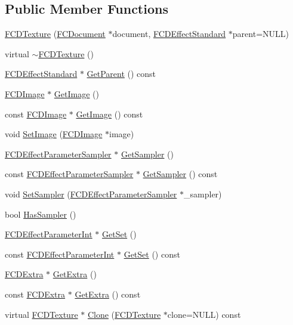\subsection*{Public Member Functions}
\begin{DoxyCompactItemize}
\item 
\hyperlink{classFCDTexture_a9e67960ce2912e1e9622240b658de5ce}{FCDTexture} (\hyperlink{classFCDocument}{FCDocument} $\ast$document, \hyperlink{classFCDEffectStandard}{FCDEffectStandard} $\ast$parent=NULL)
\item 
virtual \hyperlink{classFCDTexture_a9d6b6636d7f0bd5a063f15a1ccf7f3b7}{$\sim$FCDTexture} ()
\item 
\hyperlink{classFCDEffectStandard}{FCDEffectStandard} $\ast$ \hyperlink{classFCDTexture_a0752a50b91891c3381c2903992929ec9}{GetParent} () const 
\item 
\hyperlink{classFCDImage}{FCDImage} $\ast$ \hyperlink{classFCDTexture_a673c45380da9b69a37ad7a4a02676653}{GetImage} ()
\item 
const \hyperlink{classFCDImage}{FCDImage} $\ast$ \hyperlink{classFCDTexture_a83a2bf1cee6d7c48bdbb4faf7e22052a}{GetImage} () const 
\item 
void \hyperlink{classFCDTexture_acdcdbd708160b975c2a0ae6ef003048d}{SetImage} (\hyperlink{classFCDImage}{FCDImage} $\ast$image)
\item 
\hyperlink{classFCDEffectParameterSampler}{FCDEffectParameterSampler} $\ast$ \hyperlink{classFCDTexture_a18892262cc92aeddf81d25b3e5cadc46}{GetSampler} ()
\item 
const \hyperlink{classFCDEffectParameterSampler}{FCDEffectParameterSampler} $\ast$ \hyperlink{classFCDTexture_abd6252443d5e2a0ef79bb75287170a5a}{GetSampler} () const 
\item 
void \hyperlink{classFCDTexture_ad91f65cd0a265adbca7c8c6d2e431e6e}{SetSampler} (\hyperlink{classFCDEffectParameterSampler}{FCDEffectParameterSampler} $\ast$\_\-sampler)
\item 
bool \hyperlink{classFCDTexture_a46e7b4d281c59bb1dfe4f15ddefd7e49}{HasSampler} ()
\item 
\hyperlink{classFCDEffectParameterT}{FCDEffectParameterInt} $\ast$ \hyperlink{classFCDTexture_a4235750360d60f3fd8b1007743d7122b}{GetSet} ()
\item 
const \hyperlink{classFCDEffectParameterT}{FCDEffectParameterInt} $\ast$ \hyperlink{classFCDTexture_a00cee43e86f98b9d150240a81ca75c21}{GetSet} () const 
\item 
\hyperlink{classFCDExtra}{FCDExtra} $\ast$ \hyperlink{classFCDTexture_a3fd6a6b4b12975a7befb2d600b8be859}{GetExtra} ()
\item 
const \hyperlink{classFCDExtra}{FCDExtra} $\ast$ \hyperlink{classFCDTexture_a34dc0804e1d6af28f71fd87912347860}{GetExtra} () const 
\item 
virtual \hyperlink{classFCDTexture}{FCDTexture} $\ast$ \hyperlink{classFCDTexture_a94f511548049c74605bdd6e2388d6b1b}{Clone} (\hyperlink{classFCDTexture}{FCDTexture} $\ast$clone=NULL) const 
\end{DoxyCompactItemize}


